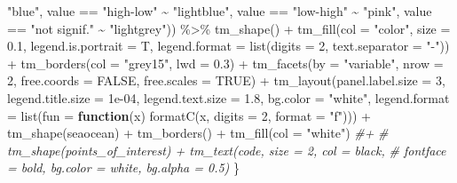 \documentclass[10pt,landscape,a3paper]{article}
\newenvironment{Shaded}{\begin{snugshade}}{\end{snugshade}}
\newcommand{\AttributeTok}[1]{\textcolor[rgb]{0.77,0.63,0.00}{#1}}
\newcommand{\CommentTok}[1]{\textcolor[rgb]{0.56,0.35,0.01}{\textit{#1}}}
\newcommand{\ConstantTok}[1]{\textcolor[rgb]{0.00,0.00,0.00}{#1}}
\newcommand{\ControlFlowTok}[1]{\textcolor[rgb]{0.13,0.29,0.53}{\textbf{#1}}}
\newcommand{\DecValTok}[1]{\textcolor[rgb]{0.00,0.00,0.81}{#1}}
\newcommand{\FloatTok}[1]{\textcolor[rgb]{0.00,0.00,0.81}{#1}}
\newcommand{\FunctionTok}[1]{\textcolor[rgb]{0.00,0.00,0.00}{#1}}
\newcommand{\NormalTok}[1]{#1}
\newcommand{\SpecialCharTok}[1]{\textcolor[rgb]{0.00,0.00,0.00}{#1}}
\newcommand{\StringTok}[1]{\textcolor[rgb]{0.31,0.60,0.02}{#1}}
\begin{document}
\begin{Shaded}
\begin{Highlighting}[]
            \StringTok{"blue"}\NormalTok{, value }\SpecialCharTok{==} \StringTok{"high{-}low"} \SpecialCharTok{\textasciitilde{}} \StringTok{"lightblue"}\NormalTok{, value }\SpecialCharTok{==} \StringTok{"low{-}high"} \SpecialCharTok{\textasciitilde{}} \StringTok{"pink"}\NormalTok{,}
\NormalTok{            value }\SpecialCharTok{==} \StringTok{"not signif."} \SpecialCharTok{\textasciitilde{}} \StringTok{"lightgrey"}\NormalTok{)) }\SpecialCharTok{\%\textgreater{}\%}
        \FunctionTok{tm\_shape}\NormalTok{() }\SpecialCharTok{+} \FunctionTok{tm\_fill}\NormalTok{(}\AttributeTok{col =} \StringTok{"color"}\NormalTok{, }\AttributeTok{size =} \FloatTok{0.1}\NormalTok{, }\AttributeTok{legend.is.portrait =}\NormalTok{ T, }\AttributeTok{legend.format =} \FunctionTok{list}\NormalTok{(}\AttributeTok{digits =} \DecValTok{2}\NormalTok{,}
        \AttributeTok{text.separator =} \StringTok{"{-}"}\NormalTok{)) }\SpecialCharTok{+} \FunctionTok{tm\_borders}\NormalTok{(}\AttributeTok{col =} \StringTok{"grey15"}\NormalTok{, }\AttributeTok{lwd =} \FloatTok{0.3}\NormalTok{) }\SpecialCharTok{+} \FunctionTok{tm\_facets}\NormalTok{(}\AttributeTok{by =} \StringTok{"variable"}\NormalTok{,}
        \AttributeTok{nrow =} \DecValTok{2}\NormalTok{, }\AttributeTok{free.coords =} \ConstantTok{FALSE}\NormalTok{, }\AttributeTok{free.scales =} \ConstantTok{TRUE}\NormalTok{) }\SpecialCharTok{+} \FunctionTok{tm\_layout}\NormalTok{(}\AttributeTok{panel.label.size =} \DecValTok{3}\NormalTok{,}
        \AttributeTok{legend.title.size =} \FloatTok{1e{-}04}\NormalTok{, }\AttributeTok{legend.text.size =} \FloatTok{1.8}\NormalTok{, }\AttributeTok{bg.color =} \StringTok{"white"}\NormalTok{, }\AttributeTok{legend.format =} \FunctionTok{list}\NormalTok{(}\AttributeTok{fun =} \ControlFlowTok{function}\NormalTok{(x) }\FunctionTok{formatC}\NormalTok{(x,}
            \AttributeTok{digits =} \DecValTok{2}\NormalTok{, }\AttributeTok{format =} \StringTok{"f"}\NormalTok{))) }\SpecialCharTok{+} \FunctionTok{tm\_shape}\NormalTok{(seaocean) }\SpecialCharTok{+} \FunctionTok{tm\_borders}\NormalTok{() }\SpecialCharTok{+} \FunctionTok{tm\_fill}\NormalTok{(}\AttributeTok{col =} \StringTok{"white"}\NormalTok{)  }\CommentTok{\#+ }
    \CommentTok{\# tm\_shape(points\_of\_interest) + tm\_text(\textquotesingle{}code\textquotesingle{}, size = 2, col = \textquotesingle{}black\textquotesingle{},}
    \CommentTok{\# fontface = \textquotesingle{}bold\textquotesingle{}, bg.color = \textquotesingle{}white\textquotesingle{}, bg.alpha = 0.5)}
\NormalTok{\}}
\end{Highlighting}
\end{Shaded}
\end{document}
